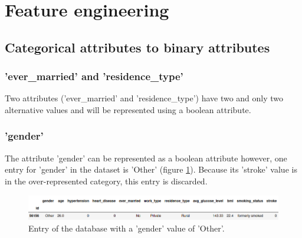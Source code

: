 \section{Feature engineering}
\label{section_feature_engineering}
\subsection{Categorical attributes to binary attributes}

\subsubsection{'ever\_married' and 'residence\_type'}
Two attributes ('ever\_married' and 'residence\_type') have two and only two alternative values and 
will be represented using a boolean attribute.\\

\subsubsection{'gender'}
The attribute 'gender' can be represented as a boolean attribute however, one entry for 
'gender' in the dataset is 'Other' (figure \ref{figure_gender_other}). Because its 'stroke' value is in 
the over-represented category, this entry is discarded.\\

\begin{figure}[H]
\centering
\includegraphics[scale=0.5]{figures/dataset_gender_other.png}
\caption{Entry of the database with a 'gender' value of 'Other'.}
\label{figure_gender_other}
\end{figure}


